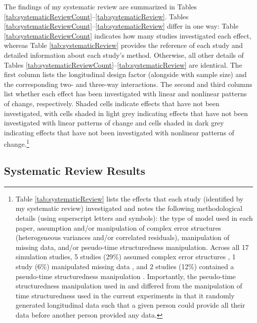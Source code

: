 \documentclass[
12pt, %
twoside,
english]{guelphthesis}
\begin{document}
The findings of my systematic review are summarized in Tables \ref{tab:systematicReviewCount}--\ref{tab:systematicReview}. Tables \ref{tab:systematicReviewCount}--\ref{tab:systematicReview} differ in one way: Table \ref{tab:systematicReviewCount} indicates how many studies investigated each effect, whereas Table \ref{tab:systematicReview} provides the reference of each study and detailed information about each study's method. Otherwise, all other details of Tables \ref{tab:systematicReviewCount}--\ref{tab:systematicReview} are identical. The first column lists the longitudinal design factor (alongside with sample size) and the corresponding two- and three-way interactions. The second and third columns list whether each effect has been investigated with linear and nonlinear patterns of change, respectively. Shaded cells indicate effects that have not been investigated, with cells shaded in light grey indicating effects that have not been investigated with linear patterns of change and cells shaded in dark grey indicating effects that have not been investigated with nonlinear patterns of change.\footnote{Table \ref{tab:systematicReview} lists the effects that each study (identified by my systematic review) investigated and notes the following methodological details (using superscript letters and symbols): the type
of model used in each paper, assumption and/or manipulation of complex error structures
(heterogeneous variances and/or correlated residuals), manipulation of missing data,
and/or pseudo-time structuredness manipulation. Across all 17 simulation studies, 5 studies (29\%) assumed complex error structures \parencites{gasimova2014}{liu2021}{liu2015}{miller2017}{murphy2011}, 1 study (6\%) manipulated missing data \parencite{fine2019}, and 2 studies (12\%) contained a pseudo-time structuredness manipulation \parencites{fine2019}{fine2020}. Importantly, the pseudo-time structuredness manipulation used in \textcite{fine2019} and \textcite{fine2020} differed from the manipulation of time structuredness used in the current experiments \parencites[and from previous simulation experiments of][]{coulombe2016}{miller2017} in that it randomly generated longitudinal data such that a given person could provide all their data before another person provided any data.}

\hypertarget{systematic-review-results}{%
\subsection{Systematic Review Results}\label{systematic-review-results}}
\end{document}
